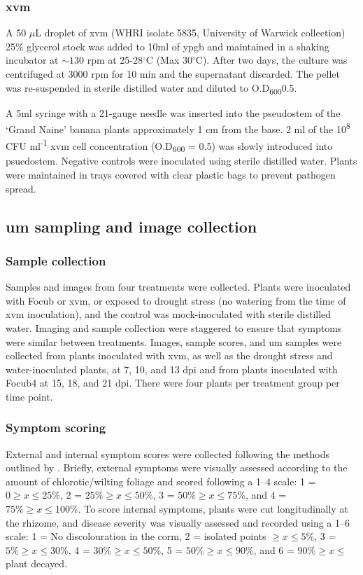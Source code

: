 \subsubsection{\acl{xvm}}
A 50 \(\mu\)L droplet of \acf{xvm} (WHRI isolate 5835, University of Warwick collection) 25\% glycerol stock was added to 10ml of \ac{ypgb} and maintained in a shaking incubator at $\sim130$ rpm at 25-28$^{\circ}$C (Max 30$^{\circ}$C). After two days, the culture was centrifuged at 3000 rpm for 10 min and the supernatant discarded. The pellet was re-suspended in sterile distilled water and diluted to O.D\textsubscript{600}0.5. 

A 5ml syringe with a 21-gauge needle was inserted into the pseudostem of the ‘Grand Naine’ banana plants approximately 1 cm from the base. 2 ml of the 10\textsuperscript{8} CFU ml\textsuperscript{-1} \ac{xvm} cell concentration (O.D\textsubscript{600} = 0.5) was slowly introduced into psuedostem. Negative controls were inoculated using sterile distilled water. Plants were maintained in trays covered with clear plastic bags to prevent pathogen spread. 

\subsection{\Acl{um} sampling and image collection}
\subsubsection{Sample collection}
Samples and images from four treatments were collected. Plants were inoculated with \ac{Focub} or \ac{xvm}, or exposed to drought stress (no watering from the time of \ac{xvm} inoculation), and the control was mock-inoculated with sterile distilled water. Imaging and sample collection were staggered to ensure that symptoms were similar between treatments. Images, sample scores, and \ac{um} samples were collected from plants inoculated with \ac{xvm}, as well as the drought stress and water-inoculated plants, at 7, 10, and 13 \ac{dpi} and from plants inoculated with \ac{Focub4} at 15, 18, and 21 \ac{dpi}. There were four plants per treatment group per time point.  

\subsubsection{Symptom scoring}
External and internal symptom scores were collected following the methods outlined by \textcite{Garcia-Bastidas2019}. Briefly, external symptoms were visually assessed according to the amount of chlorotic/wilting foliage and scored following a 1–4 scale: 1 = $0\ge x \leq25\%$, 2 = $25\%\ge x \leq50\%$, 3 = $50\%\ge x \leq75\%$, and 4 = $75\%\ge x \leq100\%$. To score internal symptoms, plants were cut longitudinally at the rhizome, and disease severity was visually assessed and recorded using a 1–6 scale: 1 = No discolouration in the corm, 2 = isolated points $\ge x \leq5\%$, 3 = $5\%\ge x \leq30\%$, 4 = $30\%\ge x \leq50\%$, 5 = $50\%\ge x \leq90\%$, and 6 = $90\%\ge x \leq$ plant decayed. 

